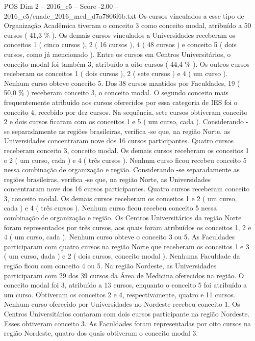 \begin{textsample}{POS Dim 2 – 2016\_c5 – Score -2.00 – 2016\_c5/enade\_2016\_med\_d7a7806f6b.txt}
Os cursos vinculados a esse tipo de Organização Acadêmica tiveram o conceito 3 como conceito modal, atribuído a 50 cursos ( 41,3 \% ).
Os demais cursos vinculados a Universidades receberam os conceitos 1 ( cinco cursos ), 2 ( 16 cursos ), 4 ( 48 cursos ) e conceito 5 ( dois cursos, como já mencionado ).
Entre os cursos em Centros Universitários, o conceito modal foi também 3, atribuído a oito cursos ( 44,4 \% ).
Os outros cursos receberam os conceitos 1 ( dois cursos ), 2 ( sete cursos ) e 4 ( um curso ).
Nenhum curso obteve conceito 5.
Dos 38 cursos mantidos por Faculdades, 19 ( 50,0 \% ) receberam conceito 3, o conceito modal.
O segundo conceito mais frequentemente atribuído aos cursos oferecidos por essa categoria de IES foi o conceito 4, recebido por dez cursos.
Na sequência, sete cursos obtiveram conceito 2 e dois cursos ficaram com os conceitos 1 e 5 ( um curso, cada ).
Considerando -se separadamente as regiões brasileiras, verifica -se que, na região Norte, as Universidades concentraram nove dos 16 cursos participantes.
Quatro cursos receberam conceito 3, conceito modal.
Os demais cursos receberam os conceitos 1 e 2 ( um curso, cada ) e 4 ( três cursos ).
Nenhum curso ficou recebeu conceito 5 nessa combinação de organização e região.
Considerando -se separadamente as regiões brasileiras, verifica -se que, na região Norte, as Universidades concentraram nove dos 16 cursos participantes.
Quatro cursos receberam conceito 3, conceito modal.
Os demais cursos receberam os conceitos 1 e 2 ( um curso, cada ) e 4 ( três cursos ).
Nenhum curso ficou recebeu conceito 5 nessa combinação de organização e região.
Os Centros Universitários da região Norte foram representados por três cursos, aos quais foram atribuídos os conceitos 1, 2 e 4 ( um curso, cada ).
Nenhum curso obteve o conceito 3 ou 5.
As Faculdades participaram com quatro cursos na região Norte que receberam os conceitos 1 e 3 ( um curso, dada ) e 2 ( dois cursos, conceito modal ).
Nenhuma Faculdade da região ficou com conceito 4 ou 5.
Na região Nordeste, as Universidades participaram com 29 dos 39 cursos da Área de Medicina oferecidos na região.
O conceito modal foi 3, atribuído a 13 cursos, enquanto o conceito 5 foi atribuído a um curso.
Obtiveram os conceitos 2 e 4, respectivamente, quatro e 11 cursos.
Nenhum curso oferecido por Universidades no Nordeste recebeu conceito 1.
Os Centros Universitários contaram com dois cursos participante na região Nordeste.
Esses obtiveram conceito 3.
As Faculdades foram representadas por oito cursos na região Nordeste, quatro dos quais obtiveram o conceito modal 3.

\end{textsample}
